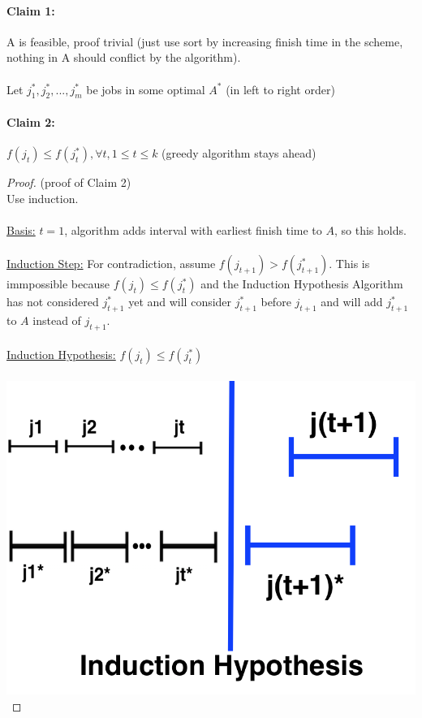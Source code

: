 \documentclass[12pt]{article}
\begin{document}
\paragraph{Claim 1:} A is feasible, proof trivial (just use sort by increasing finish time in the scheme, nothing in A should conflict by the algorithm).\\
\\
Let $j_1^*, j_2^*, ... , j_m^*$ be jobs in some optimal $A^*$ (in left to right order)
\paragraph{Claim 2:} $f(j_t) \leq f(j_t^*), \forall t, 1 \leq t \leq k$ (greedy algorithm stays ahead)

\begin{proof}
(proof of Claim 2)\\
Use induction.\\
\\
\underline{Basis:} $t=1$, algorithm adds interval with earliest finish time to $A$, so this holds.\\
\\
\underline{Induction Step:} For contradiction, assume $f(j_{t+1}) > f(j_{t+1}^*)$. This is immpossible because $f(j_t) \leq f(j^*_t)$ and the Induction Hypothesis Algorithm has not considered $j^*_{t+1}$ yet and will consider $j^*_{t+1}$ before $j_{t+1}$ and will add $j^*_{t+1}$ to $A$ instead of $j_{t+1}$.\\
\\
\underline{Induction Hypothesis:} $f(j_t) \leq f(j^*_{t})$\\
\\
\includegraphics{interval5}\\

\end{proof}
\end{document}
